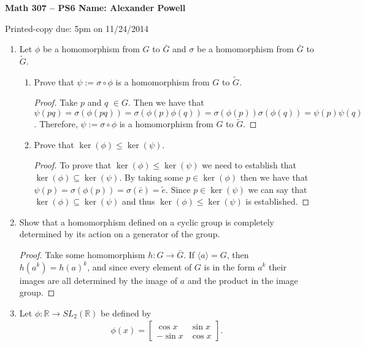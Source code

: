 \documentclass[a4paper]{article}
\newcommand{\bb}[1]{\mathbb{#1}}								%
\begin{document}
\textbf{Math 307 -- PS6 \hfill Name: Alexander Powell}

Printed-copy due: 5pm on 11/24/2014 

\begin{enumerate}[leftmargin=*, label=(\textbf{\arabic*})]
\item Let $\phi$ be a homomorphism from $G$ to $\bar{G}$ and $\sigma$ be a homomorphism from $\bar{G}$ to $\tilde{G}$. 

\begin{enumerate}[leftmargin=*, label=(\textbf{\alph*})]
\item Prove that $\psi:=\sigma \circ \phi$ is a homomorphism from $G$ to $\tilde{G}$.

\begin{proof}
Take $p$ and $q$ $\in G$.  Then we have that $\psi(pq) = \sigma(\phi(pq)) = \sigma(\phi(p)\phi(q)) = \sigma(\phi(p)) \sigma(\phi(q)) = \psi(p) \psi(q)$.  Therefore, $\psi:=\sigma \circ \phi$ is a homomorphism from $G$ to $\tilde{G}$.  
\end{proof}

\item Prove that $\ker(\phi) \leq \ker(\psi)$.

\begin{proof}
To prove that $\ker(\phi) \leq \ker(\psi)$ we need to establish that $\ker(\phi) \subseteq \ker(\psi)$.  By taking some $p \in \ker(\phi)$ then we have that $\psi(p) = \sigma(\phi(p)) = \sigma(\bar{e}) = \tilde{e}$.  Since $p \in \ker(\psi)$ we can say that $\ker(\phi) \subseteq \ker(\psi)$ and thus $\ker(\phi) \leq \ker(\psi)$ is established.  
\end{proof}

\end{enumerate} 

\item Show that a homomorphism defined on a cyclic group is completely determined by its action on a generator of the group.

\begin{proof}
Take some homomorphism $h:G \rightarrow \bar{G}$.  If $\langle a \rangle = G$, then $h(a^{k}) = h(a)^{k}$, and since every element of $G$ is in the form $a^{k}$ their images are all determined by the image of $a$ and the product in the image group.  
\end{proof}

\item Let $\phi: \bb{R} \rightarrow SL_2 (\bb{R})$ be defined by
\begin{align*}
\phi(x) = 
\left[
\begin{array}{rr}
\cos x & \sin x \\
-\sin x & \cos x
\end{array}
\right].
\end{align*}


\end{enumerate}
\end{document}

